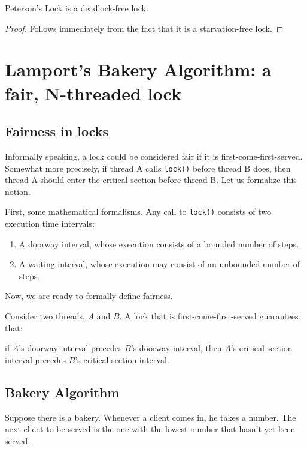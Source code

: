 \begin{claim}
    Peterson's Lock is a deadlock-free lock.
\end{claim}
\begin{proof}
    Follows immediately from the fact that it is a starvation-free lock.
\end{proof}

\section{Lamport's Bakery Algorithm: a fair, N-threaded lock}
\subsection{Fairness in locks}

Informally speaking, a lock could be considered fair if it is first-come-first-served. Somewhat more precisely, if thread A calls \verb|lock()| before thread B does, then thread A should enter the critical section before thread B. Let us formalize this notion.

First, some mathematical formalisms. Any call to \verb|lock()| consists of two execution time intervals:
\begin{enumerate}
    \item A doorway interval, whose execution consists of a bounded number of steps.
    \item A waiting interval, whose execution may consist of an unbounded number of steps.
\end{enumerate}

Now, we are ready to formally define fairness.

\begin{definition} \label{lock_fairness}
    Consider two threads, $A$ and $B$. A lock that is first-come-first-served guarantees that:
    
    if $A$'s doorway interval precedes $B$'s doorway interval, then $A$'s critical section interval precedes $B$'s critical section interval.
\end{definition}

\subsection{Bakery Algorithm}
Suppose there is a bakery. Whenever a client comes in, he takes a number. The next client to be served is the one with the lowest number that hasn't yet been served.

